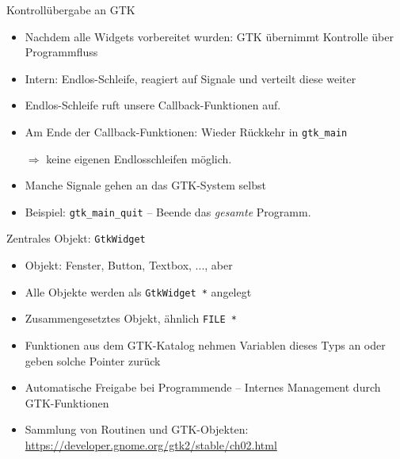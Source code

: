 \begin{frame}{Kontrollübergabe an GTK}
%
\begin{itemize}
\item Nachdem alle Widgets vorbereitet wurden: GTK übernimmt Kontrolle über Programmfluss
\item Intern: Endlos-Schleife, reagiert auf Signale und verteilt diese weiter
\item Endlos-Schleife ruft unsere Callback-Funktionen auf.
\item Am Ende der Callback-Funktionen: Wieder Rückkehr in \texttt{gtk\_main}
\item[$\Rightarrow$] keine eigenen Endlosschleifen möglich.
\item Manche Signale gehen an das GTK-System selbst
\item Beispiel: \texttt{gtk\_main\_quit} -- Beende das \emph{gesamte} Programm.
\end{itemize}
%
\end{frame}


\begin{frame}{Zentrales Objekt: \texttt{GtkWidget}}
%
\begin{itemize}
\item Objekt: Fenster, Button, Textbox, ..., aber 
\item Alle Objekte werden als \texttt{GtkWidget *} angelegt
\item Zusammengesetztes Objekt, ähnlich \texttt{FILE *}
\item Funktionen aus dem GTK-Katalog nehmen Variablen dieses Typs an oder geben solche Pointer zurück
\item Automatische Freigabe bei Programmende -- Internes Management durch GTK-Funktionen
\item Sammlung von Routinen und GTK-Objekten:\\
	\url{https://developer.gnome.org/gtk2/stable/ch02.html}
\end{itemize}
%
\end{frame}


